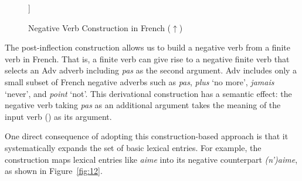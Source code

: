 \documentclass[output=paper]{langsci/langscibook}
\begin{document}
{\begin{exe}
\begin{xlist}
\begin{exe}
\begin{xlist}
\begin{figure}
	\begin{forest}
		[\begin{avm}
			\[\tp{neg-fin-v}\\
			form & \<(\tpv{ne})\ $+$ \@{2}\>\\
			syn & \[head & \[vform & fin\\
			neg & $+$\]\]\\
			arg-st & \<\@{1}XP\>\ $\oplus$ \<$\textnormal{Adv}_\textnormal{I}$\>\ $\oplus$ L \]
		\end{avm}
			[\begin{avm}
				\[\tpv{fin-v}\\
				form & \<\@{2}\>\\
				syn|head|vform & fin\\
				arg-st &  \<\@{1}XP\>\ $\oplus$ L\]
			\end{avm}]]
	\end{forest}
\caption{Negative Verb Construction in French ($\uparrow$)}\label{fig:11}
\end{figure}

%
%
The post-inflection construction allows us
to build a negative verb from a finite verb in French.
That is, a finite verb can give rise to a negative finite
verb that selects an Adv
adverb including \emph{pas} as the second
argument.
Adv includes only a small subset of French negative adverbs such
as \emph{pas}, \emph{plus} `no more', \emph{jamais} `never', and
\emph{point} `not'. This derivational construction has a semantic effect: the
negative verb taking \emph{pas} as an additional argument takes the meaning of
the input verb () as its argument.

One direct consequence of adopting this construction-based approach
is that it systematically expands the set of basic lexical entries.
For example, the construction maps lexical entries like
\emph{aime} into its negative counterpart \emph{(n')aime}, as shown
in Figure~\ref{fig:12}.


\end{xlist}
\end{exe}
\end{xlist}
\end{exe}}
\end{document}

